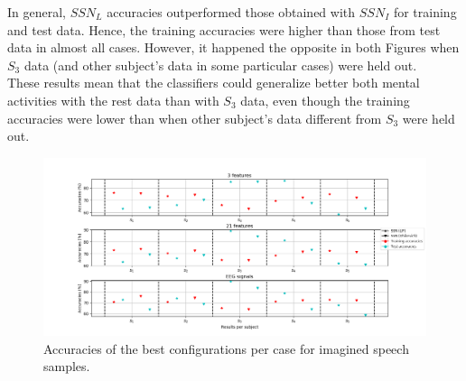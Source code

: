 In general, $SSN_{L}$ accuracies outperformed those obtained with $SSN_{I}$ for training and test data. Hence, the training accuracies were higher than those from test data in almost all cases. However, it happened the opposite in both Figures when $S_{3}$ data (and other subject's data in some particular cases) were held out.\\

These results mean that the classifiers could generalize better both mental activities with the rest data than with $S_{3}$ data, even though the training accuracies were lower than when other subject's data different from $S_{3}$ were held out.\\

\begin{figure}[h!]
	\centering
	\includegraphics[width=\linewidth]{Figures/Accuracies_SSN_Imagined.png}
	\caption{Accuracies of the best configurations per case for imagined speech samples.}
	\label{Fig: Accuracies_SSN_Imagined}
\end{figure}

